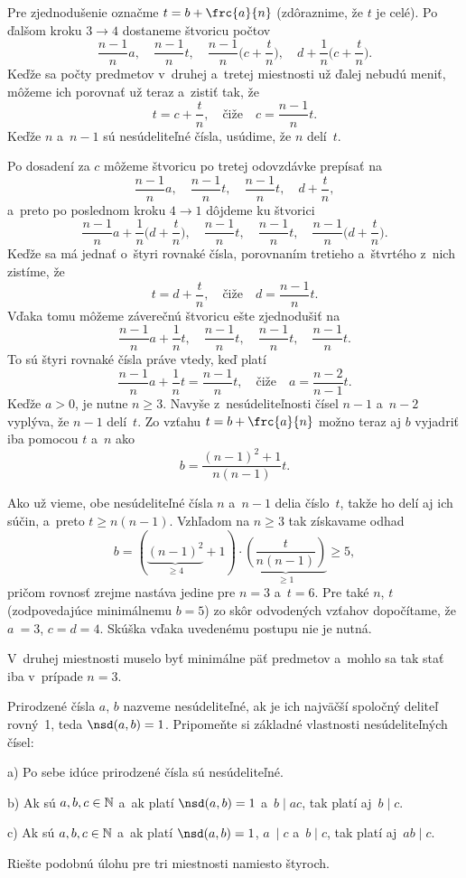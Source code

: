 {Pre zjednodušenie označme $t = b+\frc{a}{n}$ (zdôraznime, že $t$ je celé).
Po ďalšom kroku $3\to4$ dostaneme štvoricu počtov
$$
\frac{n-1}{n}a,\quad \frac{n-1}{n}t,\quad \frac{n-1}{n}\Big(c+\frac{t}{n}\Big),\quad d + \frac{1}{n}\Big(c+\frac{t}{n}\Big).
$$
Keďže sa počty predmetov v~druhej a~tretej miestnosti už ďalej nebudú meniť,
môžeme ich porovnať už teraz a~zistiť tak, že
$$
t = c+\frac{t}{n}, \quad \text{čiže} \quad c = \frac{n-1}{n}t.
$$
Keďže $n$ a~$n-1$ sú nesúdeliteľné čísla, usúdime, že $n$ delí~$t$.

Po dosadení za $c$ môžeme štvoricu po tretej odovzdávke prepísať na
$$
\frac{n-1}{n}a,\quad \frac{n-1}{n}t,\quad \frac{n-1}{n}t,\quad d + \frac{t}{n},
$$
a~preto po poslednom kroku $4 \to 1$ dôjdeme ku štvorici
$$
\frac{n-1}{n}a+\frac{1}{n}\Big(d +\frac{t}{n} \Big),\quad \frac{n-1}{n}t,\quad \frac{n-1}{n}t,\quad
\frac{n-1}{n}\Big(d + \frac{t}{n}\Big).
$$
Keďže sa má jednať o~štyri rovnaké čísla,
porovnaním tretieho a~štvrtého z~nich zistíme, že
$$
t = d+\frac{t}{n}, \quad \text{čiže} \quad d = \frac{n-1}{n}t.
$$
Vďaka tomu môžeme záverečnú štvoricu ešte zjednodušiť na
$$
\frac{n-1}{n}a+\frac{1}{n}t,\quad \frac{n-1}{n}t,\quad \frac{n-1}{n}t,\quad \frac{n-1}{n}t.
$$
To sú štyri rovnaké čísla práve vtedy, keď platí
$$
\frac{n-1}{n}a+\frac{1}{n}t= \frac{n-1}{n}t,
\quad \text{čiže} \quad
a=\frac{n-2}{n-1}t.
$$
Keďže $a>0$, je nutne $n \ge 3$. Navyše z~nesúdeliteľnosti
čísel $n-1$ a~$n-2$ vyplýva, že $n-1$ delí~$t$.
Zo vzťahu $t = b + \frc{a}{n}$ možno teraz aj $b$ vyjadriť iba pomocou
$t$ a~$n$ ako
$$
b = \frac{(n-1)^2+1}{n(n-1)} t.
$$

Ako už vieme, obe nesúdeliteľné čísla $n$ a~$n-1$ delia číslo~$t$, takže
ho delí aj ich súčin, a~preto $t\ge n(n-1)$. Vzhľadom
na $n \ge3$ tak získavame odhad
$$
b = (\underbrace{(n-1)^2}_{\ge 4}+1) \cdot
\underbrace{\left(\frac{t}{n(n-1)}\right)}_{\ge 1} \ge 5,
$$
pričom rovnosť zrejme nastáva jedine pre $n = 3$ a~$t = 6$. Pre také
$n$, $t$ (zodpovedajúce minimálnemu $b=5$) zo skôr odvodených
vzťahov dopočítame, že $a~= 3$, $c = d = 4$. Skúška vďaka uvedenému
postupu nie je nutná.

\odpoved
V~druhej miestnosti muselo byť minimálne päť predmetov a~mohlo sa tak
stať iba v~prípade $n = 3$.



Prirodzené čísla $a$, $b$ nazveme nesúdeliteľné, ak je ich
najväčší spoločný deliteľ rovný~1, teda
$\nsd(a,b) = 1$. Pripomeňte si základné vlastnosti nesúdeliteľných čísel:
\item{a)} Po sebe idúce prirodzené čísla sú nesúdeliteľné.
\item{b)} Ak sú $a,b,c \in \Bbb{N}$ a~ak platí $\nsd(a,b) = 1$
a~$b\mid ac$, tak platí aj~$b \mid c$.
\item{c)} Ak sú $a,b,c \in \Bbb{N}$ a~ak platí $\nsd(a,b) = 1$,
$a~\mid c$ a~$b \mid c$, tak platí aj~$ab \mid c$.

Riešte podobnú úlohu pre tri miestnosti namiesto štyroch.
}

